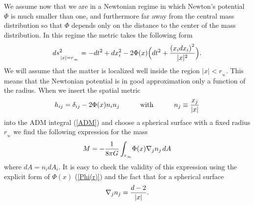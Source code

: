 \documentclass[a4paper,12pt]{article}
\newcommand{\be}{\begin{equation}}
\newcommand{\ee}{\end{equation}}
\begin{document}


 
 
 
We assume now that we are in a Newtonian regime in which  Newton's potential $\Phi$ is much smaller than one, and furthermore far away from the central mass distribution so that $\Phi$ depends only on the distance to the center of the mass distribution. In this regime the metric takes the following form\\[-2mm]
\be
\label{approxmetric}
ds^2_{\, \strut|x|= r_{{}_\infty}}= 
-dt^2 +dx_i^2 - 2\Phi(x) \Bigl(dt^2+{\left(x_i dx_i\right)^2\over |x|^2}\Bigl) .
 \ee
We will assume that the matter is localized well inside the region $|x|< r_{{}_\infty}$. This means that the Newtonian potential is in good approximation only a function of the radius.
 When we insert the spatial metric\\[-2mm]
 \be 
 h_{ij} = \delta_{ij}-2\Phi(x) n_i n_j \qquad\quad\mbox{with}\qquad\quad n_j \equiv {x_j\over |x|}
 \ee 
 into the ADM integral (\ref{ADM}) and choose a spherical surface with a fixed radius $r_{{}_\infty}$ we find the following expression for the mass 
\be
\label{ADMPhi}
M%
=-{1\over 8\pi G} \int_{r_\infty}\!\Phi(x) \nabla_j n_{j\,}  dA\ee
where $dA = n_i dA_i$. It is easy to check the validity of this expression using the explicit form of $\Phi(x)$ (\ref{Phi(r)}) and the fact that for a spherical surface\\[-2mm] 
\be
\nabla_jn_j = {d-2\over |x|}.\\[-2mm]
\ee


\end{document}
